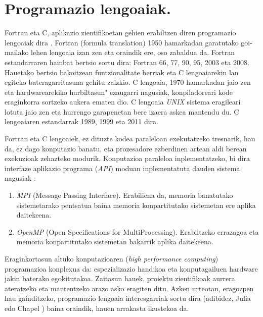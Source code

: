 \section{Programazio lengoaiak.}

Fortran eta C, aplikazio zientifikoetan gehien erabiltzen diren programazio lengoaiak dira \cite{Higham2015}. Fortran (formula translation) 1950 hamarkadan garatutako goi-mailako lehen lengoaia izan zen eta oraindik ere, oso zabaldua da. Fortran estandarraren hainbat bertsio 
sortu dira: Fortran 66, 77, 90, 95, 2003 eta 2008. Hauetako bertsio bakoitzean funtzionalitate berriak  eta C lengoaiarekin lan egiteko bateragarritasuna gehitu zaizkio.  C lengoaia, 1970 hamarkadan jaio zen eta hardwarearekiko hurbiltasun" ezaugarri nagusiak, konpiladoreari kode eraginkorra sortzeko aukera ematen dio. C lengoaia \emph{UNIX} sistema eragileari lotuta jaio zen eta hurrengo garapenetan bere izaera askea mantendu du. C lengoaiaren estandarrak 1989, 1999 eta 2011 dira.   

Fortran eta C lengoaiek, ez dituzte kodea paraleloan exekutatzeko tresnarik, hau da, ez dago konputazio banatu, eta prozesadore ezberdinen artean aldi berean exekuzioak zehazteko modurik. Konputazioa paraleloa inplementatzeko, bi dira interfaze aplikazio programa (\emph{API}) moduan inplementatuta dauden sistema nagusiak \cite{Pacheco2011}:

\begin{enumerate}
\item  \emph{MPI} (Message Passing Interface).
Erabiliena da, memoria banatutako sistemetarako pentsatua baina memoria konpartitutako sistemetan ere aplika daitekeena.

\item  \emph{OpenMP} (Open Specifications for MultiProcessing).
Erabiltzeko errazagoa eta memoria konpartitutako sistemetan bakarrik aplika daitekeena.

\end{enumerate}

Eraginkortasun altuko konputazioaren (\emph{high performance computing}) programazioa konplexua da: espezializazio handikoa  eta konputagailuen hardware jakin baterako egokitutakoa. Zaitasun hauek, proiektu zientifikoak aurrera ateratzeko eta mantentzeko arazo asko eragiten ditu. Azken urteotan, eragozpen hau gainditzeko, programazio lengoaia interesgarriak sortu dira (adibidez, Julia \cite{Bezanson2014} edo Chapel \cite{Balaji2015}) baina oraindik, hauen arrakasta ikustekoa da.

